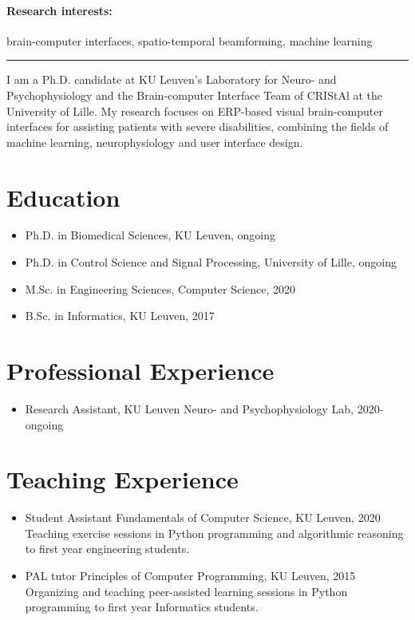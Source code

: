 \documentclass[10pt,a4paper]{article}
\begin{document}
    \paragraph{Research interests:} brain-computer interfaces, spatio-temporal beamforming, machine learning


    \bigskip
    \hrule
    \bigskip

    I am a Ph.D. candidate at KU Leuven's Laboratory for Neuro- and Psychophysiology and the Brain-computer Interface
    Team of CRIStAl at the University of Lille. My research focuses on ERP-based visual brain-computer interfaces for
    assisting patients with severe disabilities, combining the fields of machine learning, neurophysiology and
    user interface design.

    \section*{Education}

    \begin{itemize}
        \item Ph.D. in Biomedical Sciences, KU Leuven, ongoing
        \item Ph.D. in Control Science and Signal Processing, University of Lille, ongoing
        \item M.Sc. in Engineering Sciences, Computer Science, 2020
        \item B.Sc. in Informatics, KU Leuven, 2017
    \end{itemize}


    \section*{Professional Experience}
    \begin{itemize}
        \item Research Assistant, KU Leuven Neuro- and Psychophysiology Lab, 2020-ongoing
    \end{itemize}

    \section*{Teaching Experience}

    \begin{itemize}
        \item Student Assistant Fundamentals of Computer Science, KU Leuven, 2020 \\
        Teaching exercise sessions in Python programming and algorithmic reasoning to first year engineering
        students.
        \item PAL tutor Principles of Computer Programming, KU Leuven, 2015 \\
        Organizing and teaching peer-assisted learning sessions in Python programming to first year Informatics
        students.
    \end{itemize}
\end{document}
